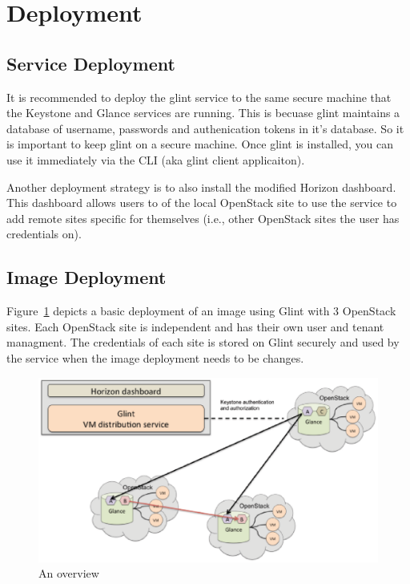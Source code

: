 \documentclass[a4paper]{jpconf}
\begin{document}
\section{Deployment}

\subsection{Service Deployment}
It is recommended to deploy the glint service to the same secure machine that the Keystone and Glance services are running. This is becuase glint maintains a database of username, passwords and authenication tokens in it's database. So it is important to keep glint on a secure machine. Once glint is installed, you can use it immediately via the CLI (aka glint client applicaiton).

Another deployment strategy is to also install the modified Horizon dashboard. This dashboard allows users to of the local OpenStack site to use the service to add remote sites specific for themselves (i.e., other OpenStack sites the user has credentials on).  

\subsection{Image Deployment}
Figure~\ref{fig:glintfigure} depicts a basic deployment of an image using Glint with 3 OpenStack sites. Each OpenStack site is independent and has their own user and tenant managment. The credentials of each site is stored on Glint securely and used by the service when the image deployment needs to be changes.

\begin{figure}[ht]
\begin{center}
\includegraphics[width=36pc]{GlintFigure.eps}
\caption{\label{fig:glintfigure}An overview }
\end{center}
\end{figure}
\end{document}
